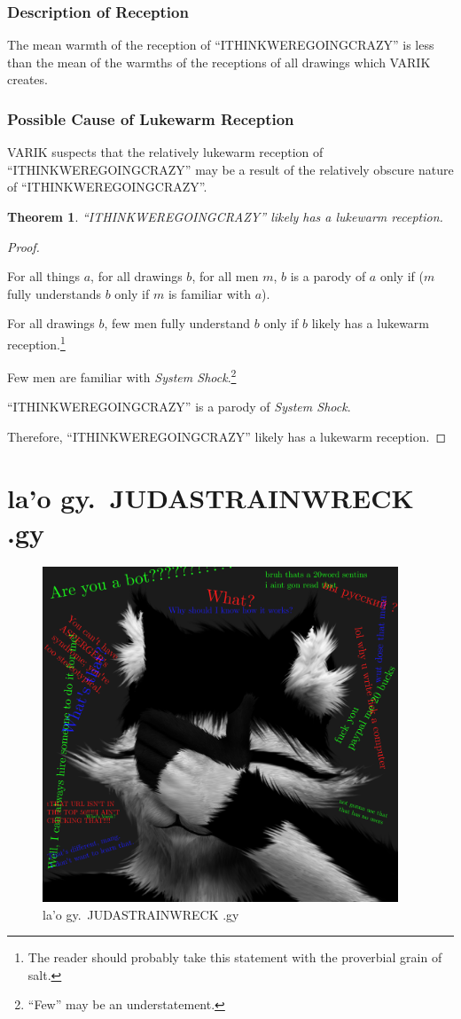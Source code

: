 \documentclass{report}
\newtheorem{thm}{Theorem}
\begin{document}
\subsection{Description of Reception}
The mean warmth of the reception of ``ITHINKWEREGOINGCRAZY'' is less than the mean of the warmths of the receptions of all drawings which VARIK creates.
\subsection{Possible Cause of Lukewarm Reception}
VARIK suspects that the relatively lukewarm reception of ``ITHINKWEREGOINGCRAZY'' may be a result of the relatively obscure nature of ``ITHINKWEREGOINGCRAZY''.
\begin{thm}
``ITHINKWEREGOINGCRAZY'' likely has a lukewarm reception.
\end{thm}
\begin{proof}
${}$

For all things $a$, for all drawings $b$, for all men $m$, $b$ is a parody of $a$ only if ($m$ fully understands $b$ only if $m$ is familiar with $a$).

For all drawings $b$, few men fully understand $b$ only if $b$ likely has a lukewarm reception.\footnote{The reader should probably take this statement with the proverbial grain of salt.}

Few men are familiar with \textit{System Shock}.\footnote{``Few'' may be an understatement.}

``ITHINKWEREGOINGCRAZY'' is a parody of \textit{System Shock}.

Therefore, ``ITHINKWEREGOINGCRAZY'' likely has a lukewarm reception.
\end{proof}
\chapter{la'o gy.\ JUDASTRAINWRECK .gy}
\begin{figure}[ht]
	\centering
	\includegraphics[height=10cm]{judastrainwreck/judastrainwreck.png}
	\caption[center]{la'o gy.\ JUDASTRAINWRECK .gy}
\end{figure}
\end{document}

